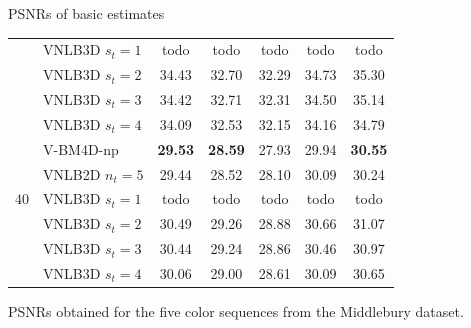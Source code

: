 \documentclass[mathserif, 8pt]{beamer}
\newcommand{\best}[1]{\textbf{\textcolor{MyOrange}{#1}}}
\begin{document}
\begin{frame}{PSNRs of basic estimates}
\begin{center}
{\begin{tabular}{ c | l |c c c c c}
		                      & VNLB3D $s_t = 1$ &       todo   &       todo   &       todo   &       todo   &       todo   \\
		                      & VNLB3D $s_t = 2$ &       34.43  &       32.70  &       32.29  &       34.73  &       35.30  \\
		                      & VNLB3D $s_t = 3$ &       34.42  &       32.71  &       32.31  &       34.50  &       35.14  \\
		                      & VNLB3D $s_t = 4$ &       34.09  &       32.53  &       32.15  &       34.16  &       34.79  \\\hline
%
		\multirow{5}{*}{$40$} & V-BM4D-np        & \best{29.53} & \best{28.59} &       27.93  &       29.94  & \best{30.55} \\%
		                      & VNLB2D $n_t = 5$ &       29.44  &       28.52  &       28.10  &       30.09  &       30.24  \\
		                      & VNLB3D $s_t = 1$ &       todo   &       todo   &       todo   &       todo   &       todo   \\
		                      & VNLB3D $s_t = 2$ &       30.49  &       29.26  &       28.88  &       30.66  &       31.07  \\
		                      & VNLB3D $s_t = 3$ &       30.44  &       29.24  &       28.86  &       30.46  &       30.97  \\
		                      & VNLB3D $s_t = 4$ &       30.06  &       29.00  &       28.61  &       30.09  &       30.65  \\\hline
		\end{tabular}}

	\bigskip

	PSNRs obtained for the five color sequences from the Middlebury dataset.

	\end{center}


\end{frame}
\end{document}

